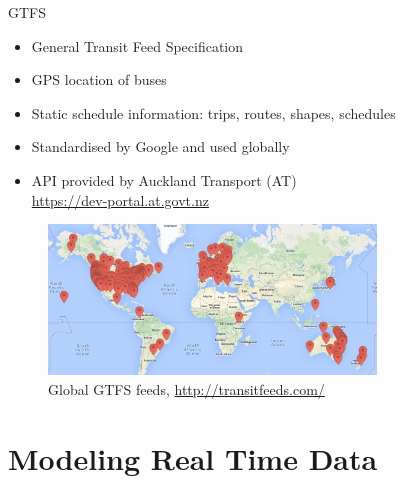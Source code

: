 \documentclass[10pt,t]{beamer}
\begin{document}
\begin{frame}{GTFS}
  \onslide<+->
  \begin{itemize}[<+- | alert@+>]
    \item General Transit Feed Specification
    \item GPS location of buses
    \item Static schedule information: trips, routes, shapes, schedules
    \item Standardised by Google and used globally
    \item API provided by Auckland Transport (AT)\\
      \url{https://dev-portal.at.govt.nz}
  \end{itemize}

  \begin{overprint}
    \begin{figure}
      \vspace{-3em}
      \centering
      \includegraphics[height=4cm]{gtfs-feeds.png}
      \caption{Global GTFS feeds, \url{http://transitfeeds.com/}}
    \end{figure}
  \end{overprint}
  \onslide<+->
\end{frame}


\section{Modeling Real Time Data}
\end{document}
